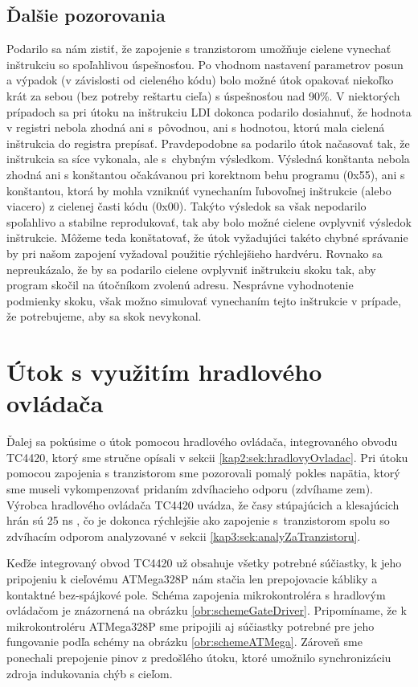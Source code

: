 \subsection{Ďalšie pozorovania}
Podarilo sa nám zistiť, že zapojenie s tranzistorom umožňuje cielene vynechať inštrukciu so spoľahlivou úspešnosťou. Po vhodnom nastavení parametrov posun a výpadok (v závislosti od cieleného kódu) bolo možné útok opakovať niekoľko krát za sebou (bez potreby reštartu cieľa) s úspešnosťou nad 90\%. V niektorých prípadoch sa pri útoku na inštrukciu LDI dokonca podarilo dosiahnuť, že hodnota v registri nebola zhodná ani s~pôvodnou, ani s hodnotou, ktorú mala cielená inštrukcia do registra prepísať. Pravdepodobne sa podarilo útok načasovať tak, že inštrukcia sa síce vykonala, ale s~chybným výsledkom. Výsledná konštanta nebola zhodná ani s konštantou očakávanou pri korektnom behu programu (0x55), ani s konštantou, ktorá by mohla vzniknúť vynechaním ľubovoľnej inštrukcie (alebo viacero) z cielenej časti kódu (0x00). Takýto výsledok sa však nepodarilo spoľahlivo a stabilne reprodukovať, tak aby bolo možné cielene ovplyvniť výsledok inštrukcie. Môžeme teda konštatovať, že útok vyžadujúci takéto chybné správanie by pri našom zapojení vyžadoval použitie rýchlejšieho hardvéru. Rovnako sa nepreukázalo, že by sa podarilo cielene ovplyvniť inštrukciu skoku tak, aby program skočil na útočníkom zvolenú adresu. Nesprávne vyhodnotenie podmienky skoku, však možno simulovať vynechaním tejto inštrukcie v prípade, že potrebujeme, aby sa skok nevykonal.

\section{Útok s využitím hradlového ovládača} \label{kap3:sek:hradlovyOvladac}
Ďalej sa pokúsime o útok pomocou hradlového ovládača, integrovaného obvodu TC4420, ktorý sme stručne opísali v sekcii \ref{kap2:sek:hradlovyOvladac}. Pri útoku pomocou zapojenia s tranzistorom sme pozorovali pomalý pokles napätia, ktorý sme museli vykompenzovať pridaním zdvíhacieho odporu (zdvíhame zem). Výrobca hradlového ovládača TC4420 uvádza, že časy stúpajúcich a klesajúcich hrán sú 25 ns \cite{gateDriver}, čo je dokonca rýchlejšie ako zapojenie s~tranzistorom spolu so zdvíhacím odporom analyzované v sekcii \ref{kap3:sek:analyZaTranzistoru}.

Keďže integrovaný obvod TC4420 už obsahuje všetky potrebné súčiastky, k jeho pripojeniu k cieľovému ATMega328P nám stačia len prepojovacie kábliky a kontaktné bez-spájkové pole. Schéma zapojenia mikrokontroléra s hradlovým ovládačom je znázornená na obrázku \ref{obr:schemeGateDriver}. Pripomíname, že k mikrokontroléru ATMega328P sme pripojili aj súčiastky potrebné pre jeho fungovanie podľa schémy na obrázku \ref{obr:schemeATMega}. Zároveň sme ponechali prepojenie pinov z predošlého útoku, ktoré umožnilo synchronizáciu zdroja indukovania chýb s cieľom.

